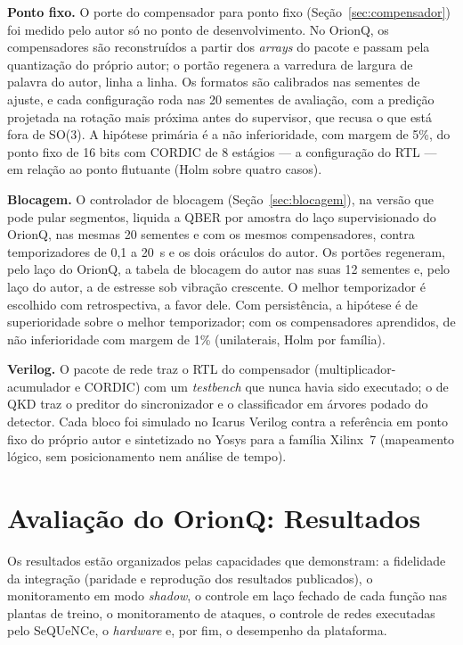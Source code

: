 \documentclass[12pt]{article}
\begin{document}
\textbf{Ponto fixo.} O porte do compensador para ponto fixo
(Seção~\ref{sec:compensador}) foi medido pelo autor só no ponto de desenvolvimento.
No OrionQ, os compensadores são reconstruídos a partir dos \textit{arrays} do
pacote e passam pela quantização do próprio autor; o portão regenera a varredura
de largura de palavra do autor, linha a linha. Os formatos são calibrados nas
sementes de ajuste, e cada configuração roda nas 20 sementes de avaliação, com a
predição projetada na rotação mais próxima antes do supervisor, que recusa o que
está fora de SO(3). A hipótese primária é a não inferioridade, com margem de 5\%,
do ponto fixo de 16 bits com CORDIC de 8 estágios --- a configuração do RTL ---
em relação ao ponto flutuante (Holm sobre quatro casos).

\textbf{Blocagem.} O controlador de blocagem (Seção~\ref{sec:blocagem}), na versão
que pode pular segmentos, liquida a QBER por amostra do laço supervisionado do
OrionQ, nas mesmas 20 sementes e com os mesmos compensadores, contra
temporizadores de 0,1 a 20~s e os dois oráculos do autor. Os portões regeneram,
pelo laço do OrionQ, a tabela de blocagem do autor nas suas 12 sementes e, pelo
laço do autor, a de estresse sob vibração crescente. O melhor temporizador é
escolhido com retrospectiva, a favor dele. Com persistência, a hipótese é de
superioridade sobre o melhor temporizador; com os compensadores aprendidos, de não
inferioridade com margem de 1\% (unilaterais, Holm por família).

\textbf{Verilog.} O pacote de rede traz o RTL do compensador (multiplicador-acumulador
e CORDIC) com um \textit{testbench} que nunca havia sido executado; o de QKD traz
o preditor do sincronizador e o classificador em árvores podado do detector. Cada
bloco foi simulado no Icarus Verilog contra a referência em ponto fixo do próprio
autor e sintetizado no Yosys para a família Xilinx~7 (mapeamento lógico, sem
posicionamento nem análise de tempo).

\section{Avaliação do OrionQ: Resultados}
\label{sec:resultados}

Os resultados estão organizados pelas capacidades que demonstram: a
fidelidade da integração (paridade e reprodução dos resultados publicados), o
monitoramento em modo \textit{shadow}, o controle em laço fechado de cada função
nas plantas de treino, o monitoramento de ataques, o controle de redes executadas
pelo SeQUeNCe, o \textit{hardware} e, por fim, o desempenho da plataforma.
\end{document}
